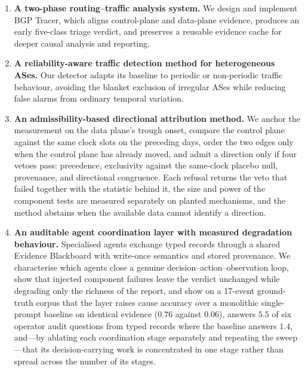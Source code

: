 \begin{enumerate}
\item \textbf{A two-phase routing--traffic analysis system.} We design
and implement BGP Tracer, which aligns control-plane and data-plane
evidence, produces an early five-class triage verdict, and preserves a
reusable evidence cache for deeper causal analysis and reporting.

\item \textbf{A reliability-aware traffic detection method for
heterogeneous ASes.} Our detector adapts its baseline to periodic or
non-periodic traffic behaviour, avoiding the blanket exclusion of
irregular ASes while reducing false alarms from ordinary temporal
variation.

\item \textbf{An admissibility-based directional attribution method.} We
anchor the measurement on the data plane's trough onset, compare the
control plane against the same clock slots on the preceding days, order
the two edges only when the control plane has already moved, and admit a
direction only
if four vetoes pass: precedence, exclusivity against
the same-clock placebo null, provenance, and directional congruence. Each
refusal returns
the veto that failed together with the statistic behind it, the size and
power of the component tests are measured separately on planted
mechanisms, and the method abstains when the available data cannot
identify a direction.

\item \textbf{An auditable agent coordination layer with measured
degradation behaviour.} Specialised agents exchange typed records
through a shared Evidence Blackboard with write-once semantics and
stored provenance. We characterise which agents close a genuine
decision--action--observation loop, show that injected component
failures leave the verdict unchanged while degrading only the
richness of the report, and show on a 17-event ground-truth corpus
that the layer raises cause accuracy over a monolithic single-prompt
baseline on identical evidence ($0.76$ against $0.06$), answers
$5.5$ of six operator audit questions from typed records where the
baseline answers $1.4$, and---by ablating each coordination stage
separately and repeating the sweep---that its decision-carrying work is
concentrated in one stage rather than spread across the number of its
stages.
\end{enumerate}